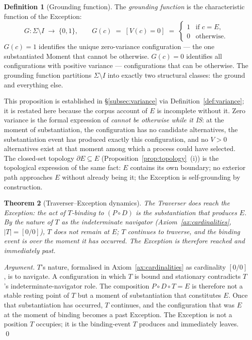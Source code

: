 \documentclass[11pt,a4paper]{article}
\newtheorem{theorem}{Theorem}[section]
\theoremstyle{definition}
\newtheorem{definition}[theorem]{Definition}
\theoremstyle{remark}
\begin{document}
\begin{definition}[Grounding function]\label{def:grounding}
The \emph{grounding function} is the characteristic function of the Exception:
\[
G : \Sigma \setminus I \;\to\; \{0, 1\}, \qquad G(c) \;=\; [V(c) = 0] \;=\; \begin{cases} 1 & \text{if } c = E, \\ 0 & \text{otherwise.}\end{cases}
\]
$G(c) = 1$ identifies the unique zero-variance configuration --- the one substantiated Moment that cannot be otherwise. $G(c) = 0$ identifies all configurations with positive variance --- configurations that can be otherwise. The grounding function partitions $\Sigma \setminus I$ into exactly two structural classes: the ground and everything else.
\end{definition}

This proposition is established in \S\ref{subsec:variance} via Definition~\ref{def:variance}; it is restated here because the corpus account of $E$ is incomplete without it. Zero variance is the formal expression of \emph{cannot be otherwise while it IS}: at the moment of substantiation, the configuration has no candidate alternatives, the substantiation event has produced exactly this configuration, and no $V > 0$ alternatives exist at that moment among which a process could have selected. The closed-set topology $\partial E \subseteq E$ (Proposition~\ref{prop:topology}~(i)) is the topological expression of the same fact: $E$ contains its own boundary; no exterior path approaches $E$ without already being it; the Exception is self-grounding by construction.

\begin{theorem}[Traverser--Exception dynamics]\label{thm:exception-T-dynamics}
The Traverser does reach the Exception: the act of $T$-binding to $(P\circ D)$ \emph{is} the substantiation that produces $E$. By the nature of $T$ as the indeterminate navigator (Axiom~\ref{ax:cardinalities}, $|T| = [0/0]$), $T$ does not remain at $E$; $T$ continues to traverse, and the binding event is over the moment it has occurred. The Exception is therefore reached and immediately past.
\end{theorem}

\begin{proof}[Argument]
$T$'s nature, formalised in Axiom~\ref{ax:cardinalities} as cardinality $[0/0]$, is to navigate. A configuration in which $T$ is bound and stationary contradicts $T$'s indeterminate-navigator role. The composition $P\circ D\circ T = E$ is therefore not a stable resting point of $T$ but a moment of substantiation that constitutes $E$. Once that substantiation has occurred, $T$ continues, and the configuration that was $E$ at the moment of binding becomes a past Exception. The Exception is not a position $T$ occupies; it is the binding-event $T$ produces and immediately leaves. \qed
\end{proof}
\end{document}
